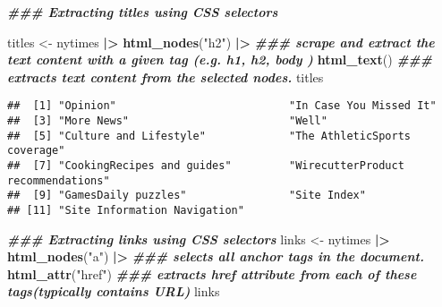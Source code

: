 \documentclass[
]{article}
\newenvironment{Shaded}{\begin{snugshade}}{\end{snugshade}}
\newcommand{\DocumentationTok}[1]{\textcolor[rgb]{0.56,0.35,0.01}{\textbf{\textit{#1}}}}
\newcommand{\FunctionTok}[1]{\textcolor[rgb]{0.13,0.29,0.53}{\textbf{#1}}}
\newcommand{\NormalTok}[1]{#1}
\newcommand{\OtherTok}[1]{\textcolor[rgb]{0.56,0.35,0.01}{#1}}
\newcommand{\SpecialCharTok}[1]{\textcolor[rgb]{0.81,0.36,0.00}{\textbf{#1}}}
\newcommand{\StringTok}[1]{\textcolor[rgb]{0.31,0.60,0.02}{#1}}
\begin{document}
\begin{Shaded}
\begin{Highlighting}[]
\DocumentationTok{\#\#\# Extracting titles using CSS selectors}

\NormalTok{titles }\OtherTok{\textless{}{-}}\NormalTok{ nytimes }\SpecialCharTok{|\textgreater{}}      
  \FunctionTok{html\_nodes}\NormalTok{(}\StringTok{"h2"}\NormalTok{) }\SpecialCharTok{|\textgreater{}}            \DocumentationTok{\#\#\# scrape and extract the text content with a given tag (e.g. h1, h2, body )}
  \FunctionTok{html\_text}\NormalTok{()                    }\DocumentationTok{\#\#\# extracts text content from the selected nodes.}
\NormalTok{titles}
\end{Highlighting}
\end{Shaded}

\begin{verbatim}
##  [1] "Opinion"                           "In Case You Missed It"            
##  [3] "More News"                         "Well"                             
##  [5] "Culture and Lifestyle"             "The AthleticSports coverage"      
##  [7] "CookingRecipes and guides"         "WirecutterProduct recommendations"
##  [9] "GamesDaily puzzles"                "Site Index"                       
## [11] "Site Information Navigation"
\end{verbatim}

\begin{Shaded}
\begin{Highlighting}[]
\DocumentationTok{\#\#\# Extracting links using CSS selectors}
\NormalTok{links }\OtherTok{\textless{}{-}}\NormalTok{ nytimes }\SpecialCharTok{|\textgreater{}}
  \FunctionTok{html\_nodes}\NormalTok{(}\StringTok{"a"}\NormalTok{) }\SpecialCharTok{|\textgreater{}}             \DocumentationTok{\#\#\# selects all anchor tags in the document.}
  \FunctionTok{html\_attr}\NormalTok{(}\StringTok{"href"}\NormalTok{)              }\DocumentationTok{\#\#\# extracts href attribute from each of these tags(typically contains URL)}
\NormalTok{links}
\end{Highlighting}
\end{Shaded}
\end{document}
